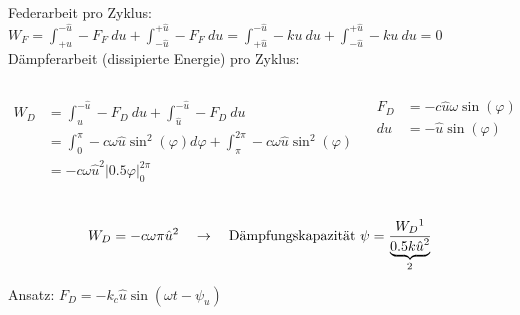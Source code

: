 \begin{frame}
        Federarbeit pro Zyklus: \\
        $W_F = \int_{+u}^{-\hat{u}} -F_F \ du + \int_{-\hat{u}}^{+\hat{u}} -F_F \ du 
        = \int_{+\hat{u}}^{-\hat{u}} -ku \ du + \int_{-\hat{u}}^{+\hat{u}} -ku \ du = 0$ 
        \vspace{0.4cm} \\

        Dämpferarbeit (dissipierte Energie) pro Zyklus: \vspace{-0.5cm}
        \begin{columns}
                \begin{column}[t]{.7 \textwidth}
                        \begin{align*}
                                W_D &= \int_{\hat{u}}^{-\hat{u}} -F_D \ du + \int_{\hat{u}}^{-\hat{u}} -F_D \ du \\
                                &= \int_{0}^{\pi} -c \omega \hat{u} \sin^{2}(\varphi) d\varphi
                                + \int_{\pi}^{2\pi} -c \omega \hat{u} \sin^{2}(\varphi) d\varphi \\
                                &= -c \omega \hat{u}^2 \left|0.5 \varphi \right|_{0}^{2 \pi} \\
                        \end{align*}
                \end{column}
                \begin{column}[t]{.3 \textwidth}
                        \begin{align*}
                                F_D &= -c\hat{u} \omega \sin(\varphi)\\
                                du &= -\hat{u} \sin(\varphi)\\        
                        \end{align*}       
                \end{column}
        \end{columns}        
\end{frame}

\begin{frame}
        \vspace{-1.5cm}
        \begin{align*}
                W_D = -c \omega \pi \hat{u}^2 \quad \rightarrow \quad
                \text{Dämpfungskapazität }\psi = \frac{W_D \footnotemark}{\underbrace{0.5 k \hat{u}^2}_{\footnotemark}}\\
        \end{align*}
        Ansatz: $F_D = -k_c \hat{u} \sin(\omega t - \psi_u)$ \vspace{0.2cm}\\
         \\

\end{frame}

